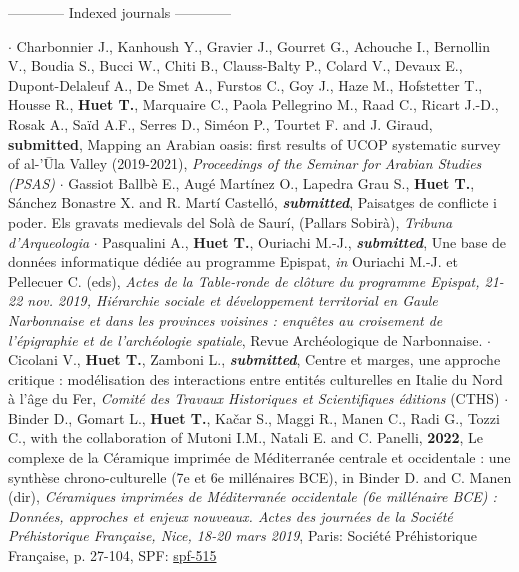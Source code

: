 \documentclass{article}
\begin{document}
\begin{center}------------ Indexed journals ------------\end{center}
$\cdot$ Charbonnier J., Kanhoush Y., Gravier J., Gourret G., Achouche I., Bernollin V., Boudia S., Bucci W., Chiti B., Clauss-Balty P., Colard V., Devaux E., Dupont-Delaleuf A., De Smet A., Furstos C., Goy J., Haze M., Hofstetter T., Housse R., \textbf{Huet T.}, Marquaire C., Paola Pellegrino M., Raad C., Ricart J.-D., Rosak A., Saïd A.F., Serres D., Siméon P., Tourtet F. and J. Giraud, \textbf{submitted}, Mapping an Arabian oasis: first results of UCOP systematic survey of al-'Ūla Valley
(2019-2021), \textit{Proceedings of the Seminar for Arabian Studies (PSAS)}
$\cdot$ Gassiot Ballbè E., Augé Martínez O., Lapedra Grau S., \textbf{Huet T.}, Sánchez Bonastre X. and R. Martí Castelló, \textit{\textbf{submitted}}, Paisatges de conflicte i poder. Els gravats medievals del Solà de Saurí, (Pallars Sobirà), \textit{Tribuna d'Arqueologia}
\smallbreak
$\cdot$ Pasqualini A., \textbf{Huet T.}, Ouriachi M.-J., \textit{\textbf{submitted}}, Une base de données informatique dédiée au programme Epispat, \textit{in} Ouriachi M.-J. et Pellecuer C. (eds), \textit{Actes de la Table-ronde de cl\^{o}ture du programme Epispat, 21-22 nov. 2019, Hi\'{e}rarchie sociale et d\'{e}veloppement territorial en Gaule Narbonnaise et dans les provinces voisines : enqu\^{e}tes au croisement de l'\'{e}pigraphie et de l'arch\'{e}ologie spatiale}, Revue Arch\'{e}ologique de Narbonnaise.
\smallbreak
$\cdot$ Cicolani V., \textbf{Huet T.}, Zamboni L., \textit{\textbf{submitted}}, Centre et marges, une approche critique : modélisation des interactions entre entités culturelles en Italie du Nord à l'âge du Fer, \textit{Comit\'{e} des Travaux Historiques et Scientifiques \'{e}ditions} (CTHS)
\smallbreak
$\cdot$ Binder D., Gomart L., \textbf{Huet T.}, Ka{\v{c}}ar S., Maggi R., Manen C., Radi G., Tozzi C., with the collaboration of Mutoni I.M., Natali E. and C. Panelli, \textbf{2022}, Le complexe de la C\'{e}ramique imprim\'{e}e de M\'{e}diterran\'{e}e centrale et occidentale : une synthèse chrono-culturelle (7e et 6e millénaires BCE), in Binder D. and C. Manen (dir), \textit{C\'{e}ramiques imprim\'{e}es de M\'{e}diterran\'{e}e occidentale (6e mill\'{e}naire BCE) : Donn\'{e}es, approches et enjeux nouveaux. Actes des journ\'{e}es de la Soci\'{e}t\'{e} Pr\'{e}historique Fran\c{c}aise, Nice, 18-20 mars 2019}, Paris: Soci\'{e}t\'{e} Pr\'{e}historique Fran\c{c}aise, p. 27-104, SPF: \href{https://www.prehistoire.org/offres/doc_inline_src/515/SPF_CIMO_27-124_binder-gomart-et-al.pdf}{spf-515}
\end{document}
